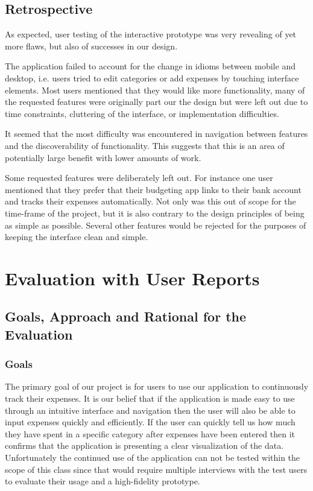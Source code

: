 \documentclass{chi2011}
\begin{document}
    \subsection{Retrospective}

	As expected, user testing of the interactive prototype was very revealing of
    yet more flaws, but also of successes in our design. 

    The application failed to account for the change in idioms between mobile
    and desktop, i.e. users tried to edit categories or add expenses by touching
    interface elements. Most users mentioned that they would like more
    functionality, many of the requested features were originally part our the
    design but were left out due to time constraints, cluttering of the
    interface, or implementation difficulties.

    It seemed that the most difficulty was encountered in navigation between
    features and the discoverability of functionality. This suggests that this
    is an area of potentially large benefit with lower amounts of work.

    Some requested features were deliberately left out. For instance one user
    mentioned that they prefer that their budgeting app links to their bank
    account and tracks their expenses automatically. Not only was this out of
    scope for the time-frame of the project, but it is also contrary to the
    design principles of being as simple as possible. Several other features
    would be rejected for the purposes of keeping the interface clean and
    simple.

\section{Evaluation with User Reports}

	\subsection{Goals, Approach and Rational for the Evaluation}

		\subsubsection{Goals}

		The primary goal of our project is for users to use our application to continuously track their
		expenses. It is our belief that if the application is made easy to use through an intuitive
		interface and navigation then the user will also be able to input expenses quickly and efficiently.
		If the user can quickly tell us how much they have spent in a specific category after expenses have
		been entered then it confirms that the application is presenting a clear visualization of the data.
		Unfortunately the continued use of the application can not be tested within the scope of this class
		since that would require multiple interviews with the test users to evaluate their usage and a
		high-fidelity prototype.
\end{document}
